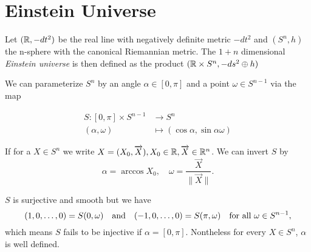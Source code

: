 
\section{Einstein Universe}

\begin{definition}
Let $(\mathbb{R},-dt^2)$ be the real line with negatively definite metric $-dt^2$ and $(S^n,h)$ the n-sphere with the canonical Riemannian metric. The $1+n$ dimensional \emph{Einstein universe} is then defined as the product $(\mathbb{R}\times S^n, -ds^2 \oplus h)$
\end{definition}

\begin{remark}
We can parameterize $S^n$ by an angle $\alpha\in [0,\pi]$ and a point $\omega\in S^{n-1}$ via the map 

\begin{align*}
    S:[0,\pi]\times S^{n-1}&\to S^n \\
    (\alpha,\omega) &\mapsto (\cos \alpha, \sin \alpha \omega)
\end{align*}

If for a $X\in S^n$ we write $X=(X_0,\overrightarrow{X}), X_0\in \mathbb{R}, \overrightarrow{X}\in \mathbb{R}^n$. We can invert $S$ by 
\[
    \alpha = \arccos X_0, \quad \omega=\frac{\overrightarrow{X}}{\lVert\overrightarrow{X}\rVert}.
\]

$S$ is surjective and smooth but we have 
\[(1,0,\dots, 0) = S(0,\omega) \quad \text{and} \quad (-1,0,\dots,0)=S(\pi,\omega) \quad \text{for all }\omega\in {S^{n-1}},\]
which means $S$ fails to be injective if $\alpha = [0,\pi]$. Nontheless for every $X\in S^n$, $\alpha$ is well defined.
\end{remark}

